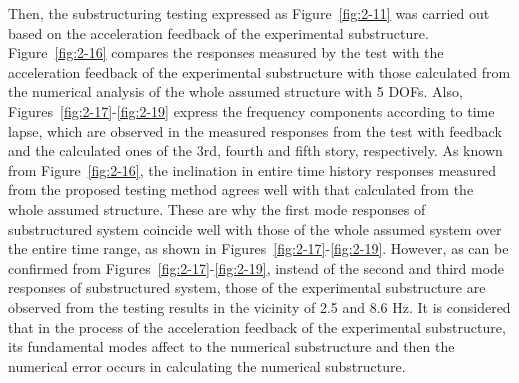  Then, the substructuring testing expressed as Figure~\ref{fig:2-11} was carried out based on the acceleration feedback of the experimental substructure. Figure~\ref{fig:2-16} compares the responses measured by the test with the acceleration feedback of the experimental substructure with those calculated from the numerical analysis of the whole assumed structure with 5 DOFs. Also, Figures~\ref{fig:2-17}-\ref{fig:2-19} express the frequency components according to time lapse, which are observed in the measured responses from the test with feedback and the calculated ones of the 3rd, fourth and fifth story, respectively. As known from Figure~\ref{fig:2-16}, the inclination in entire time history responses measured from the proposed testing method agrees well with that calculated from the whole assumed structure. These are why the first mode responses of substructured system coincide well with those of the whole assumed system over the entire time range, as shown in Figures~\ref{fig:2-17}-\ref{fig:2-19}. However, as can be confirmed from Figures~\ref{fig:2-17}-\ref{fig:2-19}, instead of the second and third mode responses of substructured system, those of the experimental substructure are observed from the testing results in the vicinity of 2.5 and 8.6 Hz. It is considered that in the process of the acceleration feedback of the experimental substructure, its fundamental modes affect to the numerical substructure and then the numerical error occurs in calculating the numerical substructure.

